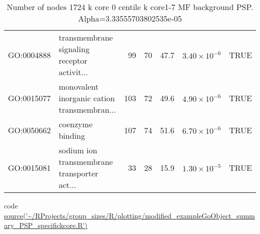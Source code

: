 \begin{table}[ht]
\begin{adjustbox}{width=\textwidth}
\begin{tabular}{llrrrrl}
  GO:0004888 & transmembrane signaling receptor activit... & 99 & 70 & 47.7 & $3.40 \times 10^{-6}$ & TRUE \\ 
  GO:0015077 & monovalent inorganic cation transmembran... & 103 & 72 & 49.6 & $4.90 \times 10^{-6}$ & TRUE \\ 
  GO:0050662 & coenzyme binding & 107 & 74 & 51.6 & $6.70 \times 10^{-6}$ & TRUE \\ 
  GO:0015081 & sodium ion transmembrane transporter act... & 33 & 28 & 15.9 & $1.30 \times 10^{-5}$ & TRUE \\ 
   \hline
\end{tabular}
\end{adjustbox}
\caption{Number of nodes 1724 k core 0 centile  k core1-7 MF background PSP. Alpha=3.33555703802535e-05} 
\label{tab:kcore range GO Number of nodes 1724 k core 0 centile  k core1-7 MF background PSP. Alpha=3.33555703802535e-05}
\end{table}

code \url{source('~/RProjects/group_sizes/R/plotting/modified_exampleGoObject_summary_PSP_specifickcore.R')}

